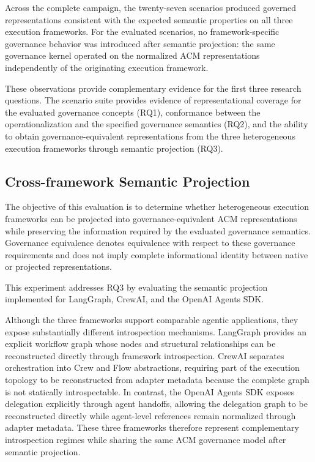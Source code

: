 \documentclass[10pt]{article}
\begin{document}
Across the complete campaign, the twenty-seven scenarios produced governed representations consistent with the expected semantic properties on all three execution frameworks. For the evaluated scenarios, no framework-specific governance behavior was introduced after semantic projection: the same governance kernel operated on the normalized ACM representations independently of the originating execution framework.

These observations provide complementary evidence for the first three research questions. The scenario suite provides evidence of representational coverage for the evaluated governance concepts (RQ1), conformance between the operationalization and the specified governance semantics (RQ2), and the ability to obtain governance-equivalent representations from the three heterogeneous execution frameworks through semantic projection (RQ3).

\subsection{Cross-framework Semantic Projection}
\label{sec:cross_framework_projection}

The objective of this evaluation is to determine whether heterogeneous execution frameworks can be projected into governance-equivalent ACM representations while preserving the information required by the evaluated governance semantics. Governance equivalence denotes equivalence with respect to these governance requirements and does not imply complete informational identity between native or projected representations.

This experiment addresses RQ3 by evaluating the semantic projection implemented for LangGraph, CrewAI, and the OpenAI Agents SDK.

Although the three frameworks support comparable agentic applications, they expose substantially different introspection mechanisms. LangGraph provides an explicit workflow graph whose nodes and structural relationships can be reconstructed directly through framework introspection. CrewAI separates orchestration into Crew and Flow abstractions, requiring part of the execution topology to be reconstructed from adapter metadata because the complete graph is not statically introspectable. In contrast, the OpenAI Agents SDK exposes delegation explicitly through agent handoffs, allowing the delegation graph to be reconstructed directly while agent-level references remain normalized through adapter metadata. These three frameworks therefore represent complementary introspection regimes while sharing the same ACM governance model after semantic projection.
\end{document}
